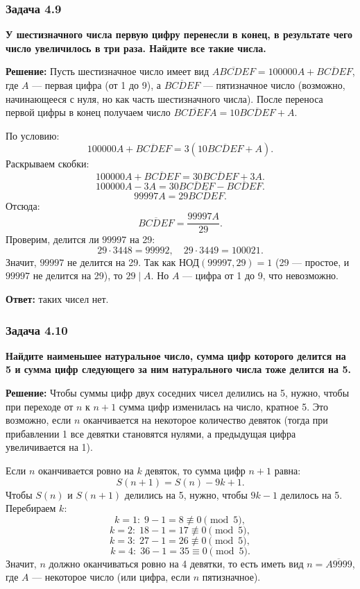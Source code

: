 \documentclass[12pt, a4paper]{article}
\begin{document}
\subsubsection*{Задача 4.9}
\textbf{У шестизначного числа первую цифру перенесли в конец, в результате чего число увеличилось в три раза. Найдите все такие числа.}

\textbf{Решение:}
Пусть шестизначное число имеет вид $\overline{ABCDEF} = 100000A + \overline{BCDEF}$, где $A$ — первая цифра (от 1 до 9), а $\overline{BCDEF}$ — пятизначное число (возможно, начинающееся с нуля, но как часть шестизначного числа). После переноса первой цифры в конец получаем число $\overline{BCDE FA} = 10\overline{BCDEF} + A$.

По условию:
\[
100000A + \overline{BCDEF} = 3(10\overline{BCDEF} + A).
\]
Раскрываем скобки:
\[
100000A + \overline{BCDEF} = 30\overline{BCDEF} + 3A.
\]
\[
100000A - 3A = 30\overline{BCDEF} - \overline{BCDEF}.
\]
\[
99997A = 29\overline{BCDEF}.
\]
Отсюда:
\[
\overline{BCDEF} = \frac{99997A}{29}.
\]
Проверим, делится ли $99997$ на 29:
\[
29 \cdot 3448 = 99992,\quad 29 \cdot 3449 = 100021.
\]
Значит, $99997$ не делится на 29. Так как $\text{НОД}(99997, 29) = 1$ (29 — простое, и $99997$ не делится на 29), то $29 \mid A$. Но $A$ — цифра от 1 до 9, что невозможно.

\textbf{Ответ:} таких чисел нет.

\subsubsection*{Задача 4.10}
\textbf{Найдите наименьшее натуральное число, сумма цифр которого делится на 5 и сумма цифр следующего за ним натурального числа тоже делится на 5.}

\textbf{Решение:}
Чтобы суммы цифр двух соседних чисел делились на 5, нужно, чтобы при переходе от $n$ к $n+1$ сумма цифр изменилась на число, кратное 5. Это возможно, если $n$ оканчивается на некоторое количество девяток (тогда при прибавлении 1 все девятки становятся нулями, а предыдущая цифра увеличивается на 1).

Если $n$ оканчивается ровно на $k$ девяток, то сумма цифр $n+1$ равна:
\[
S(n+1) = S(n) - 9k + 1.
\]
Чтобы $S(n)$ и $S(n+1)$ делились на 5, нужно, чтобы $9k - 1$ делилось на 5. Перебираем $k$:
\[
k=1:\; 9-1=8 \not\equiv 0 \pmod{5},
\]
\[
k=2:\; 18-1=17 \not\equiv 0 \pmod{5},
\]
\[
k=3:\; 27-1=26 \not\equiv 0 \pmod{5},
\]
\[
k=4:\; 36-1=35 \equiv 0 \pmod{5}.
\]
Значит, $n$ должно оканчиваться ровно на 4 девятки, то есть иметь вид $n = \overline{A9999}$, где $A$ — некоторое число (или цифра, если $n$ пятизначное).
\end{document}
